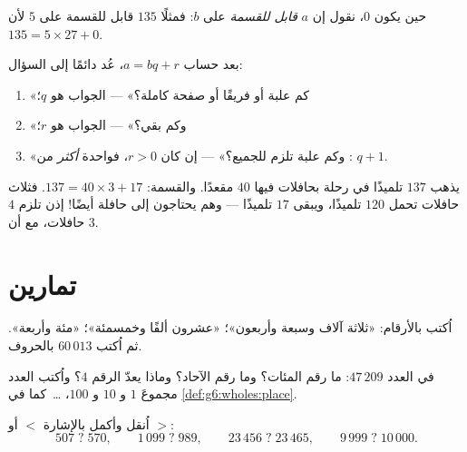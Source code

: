 \begin{definition}\label{def:g6:wholes:divisible}
حين يكون  $0$، نقول إن $a$
\emph{قابل للقسمة} على $b$: فمثلًا $135$
قابل للقسمة على $5$ لأن $135 = 5 \times 27 + 0$.
\end{definition}

\begin{method}\label{met:g6:wholes:problems}
بعد حساب $a = bq + r$، عُد دائمًا إلى السؤال:
\begin{enumerate}
  \item «كم علبة أو فريقًا أو صفحة كاملة؟» --- الجواب هو
         $q$؛
  \item «وكم بقي؟» --- الجواب هو 
        $r$؛
  \item «وكم علبة تلزم للجميع؟» --- إن كان $r > 0$، فواحدة
        \emph{أكثر} من : $q + 1$.
\end{enumerate}
\end{method}

\begin{example}\label{ex:g6:wholes:bus}
يذهب $137$ تلميذًا في رحلة بحافلات فيها $40$ مقعدًا. والقسمة:
$137 = 40 \times 3 + 17$. فثلاث حافلات تحمل $120$ تلميذًا، ويبقى $17$
تلميذًا --- وهم يحتاجون إلى حافلة أيضًا! إذن تلزم $4$ حافلات، مع أن
 $3$.
\end{example}

\section{تمارين}

\begin{exercise}[$\star$]\label{exo:g6:wholes:1}
اُكتب بالأرقام: «ثلاثة آلاف وسبعة وأربعون»؛ «عشرون ألفًا
وخمسمئة»؛ «مئة وأربعة». ثم اُكتب $60\,013$ بالحروف.
\end{exercise}

\begin{exercise}[$\star$]\label{exo:g6:wholes:2}
في العدد $47\,209$: ما رقم المئات؟ وما رقم
الآحاد؟ وماذا يعدّ الرقم $4$؟ واُكتب العدد مجموعَ
 $1$ و $10$ و $100$، \dots\ كما في
\cref{def:g6:wholes:place}.
\end{exercise}

\begin{exercise}[$\star$]\label{exo:g6:wholes:3}
اُنقل وأكمل بالإشارة $<$ أو $>$:
\[
507 \;?\; 570, \qquad
1\,099 \;?\; 989, \qquad
23\,456 \;?\; 23\,465, \qquad
9\,999 \;?\; 10\,000 .
\]
\end{exercise}

